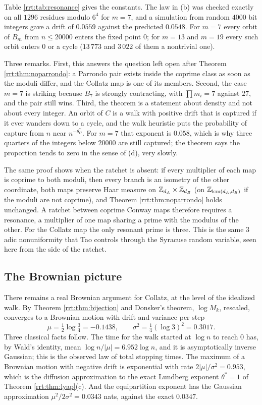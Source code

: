 Table \ref{rrt:tab:resonance} gives the constants. The law in (b) was checked exactly on all $1296$ residues modulo $6^4$ for $m=7$, and a simulation from random $4000$ bit integers gave a drift of $0.0559$ against the predicted $0.0548$. For $m=7$ every orbit of $B_m$ from $n\le 20000$ enters the fixed point $0$; for $m=13$ and $m=19$ every such orbit enters $0$ or a cycle ($13\,773$ and $3\,022$ of them a nontrivial one).

Three remarks. First, this answers the question left open after Theorem \ref{rrt:thm:noparrondo}: a Parrondo pair exists inside the coprime class as soon as the moduli differ, and the Collatz map is one of its members. Second, the case $m=7$ is striking because $B_7$ is strongly contracting, with $\prod m_i=7$ against $27$, and the pair still wins. Third, the theorem is a statement about density and not about every integer. An orbit of $C$ is a walk with positive drift that is captured if it ever wanders down to a cycle, and the walk heuristic puts the probability of capture from $n$ near $n^{-\theta^*_C}$. For $m=7$ that exponent is $0.058$, which is why three quarters of the integers below $20000$ are still captured; the theorem says the proportion tends to zero in the sense of (d), very slowly.

The same proof shows when the ratchet is absent: if every multiplier of each map is coprime to both moduli, then every branch is an isometry of the other coordinate, both maps preserve Haar measure on $\mathbb{Z}_{d_A}\times\mathbb{Z}_{d_B}$ (on $\mathbb{Z}_{\operatorname{lcm}(d_A,d_B)}$ if the moduli are not coprime), and Theorem \ref{rrt:thm:noparrondo} holds unchanged. A ratchet between coprime Conway maps therefore requires a resonance, a multiplier of one map sharing a prime with the modulus of the other. For the Collatz map the only resonant prime is three. This is the same $3$ adic nonuniformity that Tao \cite{tao2022} controls through the Syracuse random variable, seen here from the side of the ratchet.


\subsection{The Brownian picture}
There remains a real Brownian argument for Collatz, at the level of the idealized walk. By Theorem \ref{rrt:thm:bijection} and Donsker's theorem, $\log M_k$, rescaled, converges to a Brownian motion with drift and variance per step
\[
\mu=\tfrac12\log\tfrac34=-0.1438,\qquad \sigma^2=\tfrac14(\log 3)^2=0.3017 .
\]
Three classical facts follow. The time for the walk started at $\log n$ to reach $0$ has, by Wald's identity, mean $\log n/|\mu|=6.952\log n$, and it is asymptotically inverse Gaussian; this is the observed law of total stopping times. The maximum of a Brownian motion with negative drift is exponential with rate $2|\mu|/\sigma^2=0.953$, which is the diffusion approximation to the exact Lundberg exponent $\theta^*=1$ of Theorem \ref{rrt:thm:lyap}(c). And the equipartition exponent has the Gaussian approximation $\mu^2/2\sigma^2=0.0343$ nats, against the exact $0.0347$.

